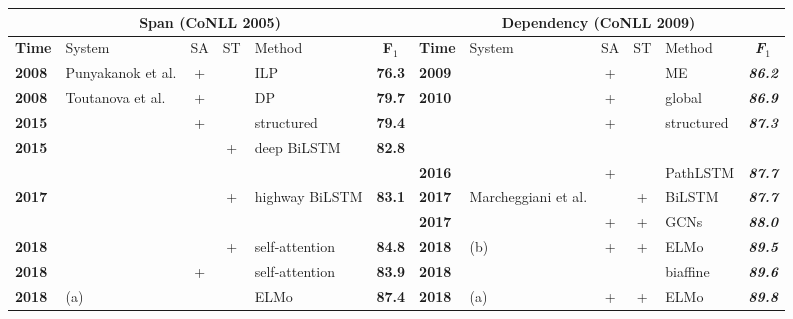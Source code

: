 \documentclass[letterpaper]{article} \usepackage{aaai19}  \usepackage{times}  \usepackage{helvet}  \usepackage{courier}  \usepackage{url}  \usepackage{graphicx}  \frenchspacing  \setlength{\pdfpagewidth}{8.5in}  \setlength{\pdfpageheight}{11in}
\begin{document}
\begin{table*}[!htp]
	\renewcommand\arraystretch{1.3}
	\setlength{\tabcolsep}{5pt}
	\centering
	\small 
\begin{tabular}{llcclc|llcclc}
		\hline
		
		\hline
		\multicolumn{6}{c|}{\textbf{Span (CoNLL 2005)}} & \multicolumn{6}{c}{\textbf{Dependency (CoNLL 2009)}} \\ 
		\hline
		\textbf{Time} & System  & SA & ST & Method & \textbf{F$_1$} & \textbf{Time} & System & SA & ST & Method & \textit{\textbf{F$_1$}} \\ 
		\hline
		\textbf{2008} & Punyakanok et al. & + & & ILP & \textbf{76.3} & \textbf{2009} & \citeauthor{Zhao2009Conll} & + &  & ME & \textit{\textbf{86.2}} \\ 
		\hline
		\textbf{2008} & Toutanova et al. & + &  & DP & \textbf{79.7} & \textbf{2010} & \citeauthor{bjorkelund2010} & + &  & global & \textit{\textbf{86.9}} \\ 
		\hline
		
		\hline
		\multicolumn{1}{l}{\textbf{2015}} & \multicolumn{1}{l}{\textbf{\citeauthor{Fitzgerald2015}}} &
		\multicolumn{1}{c}{+} & \multicolumn{1}{c}{} & \multicolumn{1}{l}{structured} & \multicolumn{1}{c}{\textbf{79.4}} & \multicolumn{2}{l}{} & \multicolumn{1}{c}{+} & \multicolumn{1}{c}{} & \multicolumn{1}{l}{structured} & \multicolumn{1}{c}{\textit{\textbf{87.3}}}\\
		\hline
		
		\hline
		\textbf{2015} & \citeauthor{zhou-xu2015} &  & +  & deep BiLSTM & \textbf{82.8} &  &  &  &  &  & \\
		\hline
		&  &  &  &  &  & \textbf{2016} & \citeauthor{roth2016} & +  &  & PathLSTM & \textit{\textbf{87.7}} \\ 
		\hline
		\textbf{2017} & \citeauthor{he-acl2017} &  & + & highway BiLSTM & \textbf{83.1} & \textbf{2017} & Marcheggiani et al. &  & +  & BiLSTM  & \textit{\textbf{87.7}} \\ 
		\hline
		&  &  &  &  &  & \textbf{2017} & \citeauthor{marcheggianiEMNLP2017} & +  & +  & GCNs  & \textit{\textbf{88.0}} \\
		\hline
		\textbf{2018} & \citeauthor{selfatt2018} &  & +  & self-attention & \textbf{84.8} & \textbf{2018} & \citeauthor{he:2018Syntax} (b) & + & +  & ELMo  & \textit{\textbf{89.5}} \\ 
		\hline
		\textbf{2018} & \citeauthor{Strubell2018}  & +  &  & self-attention & \textbf{83.9} & \textbf{2018} & \citeauthor{cai2018full} &  &  & biaffine  & \textit{\textbf{89.6}} \\ 
		\hline
		\textbf{2018} & \citeauthor{he2018jointly} (a) &  &  & ELMo  & \textbf{87.4} & \textbf{2018} & \citeauthor{li2018unified} (a) & + & + & ELMo & \textit{\textbf{89.8}} \\ 
		\hline
		

\end{tabular}
\end{table*}
\end{document}
